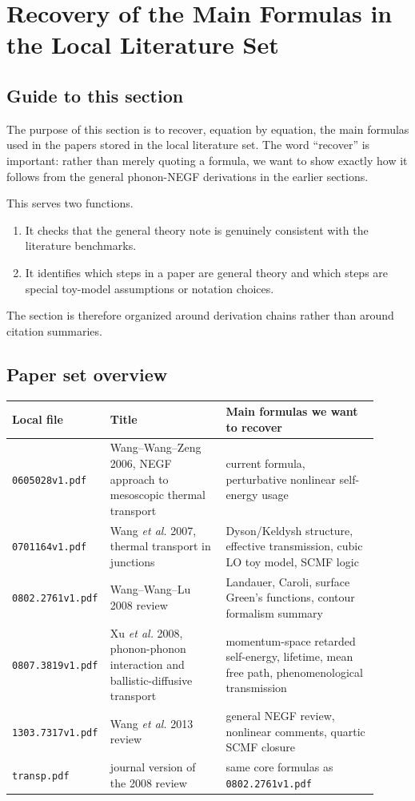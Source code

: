 \section{Recovery of the Main Formulas in the Local Literature Set}

\subsection{Guide to this section}
The purpose of this section is to recover, equation by equation, the main formulas used in the papers stored in the local literature set. The word ``recover'' is important: rather than merely quoting a formula, we want to show exactly how it follows from the general phonon-NEGF derivations in the earlier sections.

This serves two functions.
\begin{enumerate}[label=\arabic*.]
\item It checks that the general theory note is genuinely consistent with the literature benchmarks.
\item It identifies which steps in a paper are general theory and which steps are special toy-model assumptions or notation choices.
\end{enumerate}
The section is therefore organized around derivation chains rather than around citation summaries.

\subsection{Paper set overview}
\begin{longtable}{p{0.19\linewidth}p{0.31\linewidth}p{0.41\linewidth}}
\toprule
Local file & Title & Main formulas we want to recover \\
\midrule
\texttt{0605028v1.pdf} & Wang--Wang--Zeng 2006, NEGF approach to mesoscopic thermal transport & current formula, perturbative nonlinear self-energy usage \\
\texttt{0701164v1.pdf} & Wang \emph{et al.} 2007, thermal transport in junctions & Dyson/Keldysh structure, effective transmission, cubic LO toy model, SCMF logic \\
\texttt{0802.2761v1.pdf} & Wang--Wang--Lu 2008 review & Landauer, Caroli, surface Green's functions, contour formalism summary \\
\texttt{0807.3819v1.pdf} & Xu \emph{et al.} 2008, phonon-phonon interaction and ballistic-diffusive transport & momentum-space retarded self-energy, lifetime, mean free path, phenomenological transmission \\
\texttt{1303.7317v1.pdf} & Wang \emph{et al.} 2013 review & general NEGF review, nonlinear comments, quartic SCMF closure \\
\texttt{transp.pdf} & journal version of the 2008 review & same core formulas as \texttt{0802.2761v1.pdf} \\
\bottomrule
\end{longtable}

